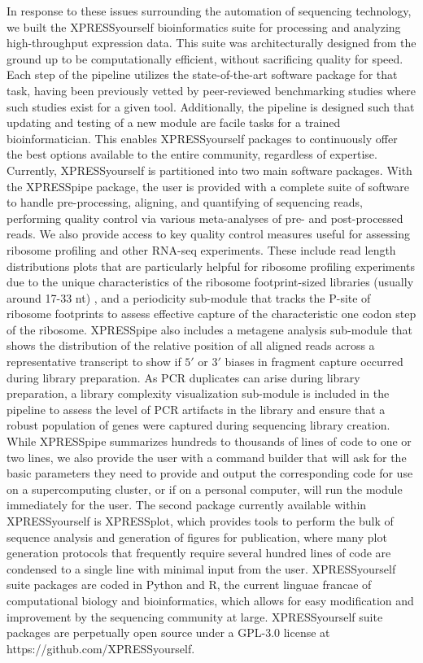 \documentclass[10pt, oneside]{article}
\begin{document}
In response to these issues surrounding the automation of sequencing technology, we built the XPRESSyourself bioinformatics suite for processing and analyzing high-throughput expression data. This suite was architecturally designed from the ground up to be computationally efficient, without sacrificing quality for speed. Each step of the pipeline utilizes the state-of-the-art software package for that task, having been previously vetted by peer-reviewed benchmarking studies where such studies exist for a given tool. Additionally, the pipeline is designed such that updating and testing of a new module are facile tasks for a trained bioinformatician. This enables XPRESSyourself packages to continuously offer the best options available to the entire community, regardless of expertise. \\

Currently, XPRESSyourself is partitioned into two main software packages. With the XPRESSpipe package, the user is provided with a complete suite of software to handle pre-processing, aligning, and quantifying of sequencing reads, performing quality control via various meta-analyses of pre- and post-processed reads. We also provide access to key quality control measures useful for assessing ribosome profiling and other RNA-seq experiments. These include read length distributions plots that are particularly helpful for ribosome profiling experiments due to the unique characteristics of the ribosome footprint-sized libraries (usually around 17-33 nt) \cite{fp_range}, and a periodicity sub-module that tracks the P-site of ribosome footprints to assess effective capture of the characteristic one codon step of the ribosome. XPRESSpipe also includes a metagene analysis sub-module that shows the distribution of the relative position of all aligned reads across a representative transcript to show if $5'$ or $3'$ biases in fragment capture occurred during library preparation. As PCR duplicates can arise during library preparation, a library complexity visualization sub-module is included in the pipeline to assess the level of PCR artifacts in the library and ensure that a robust population of genes were captured during sequencing library creation. While XPRESSpipe summarizes hundreds to thousands of lines of code to one or two lines, we also provide the user with a command builder that will ask for the basic parameters they need to provide and output the corresponding code for use on a supercomputing cluster, or if on a personal computer, will run the module immediately for the user. The second package currently available within XPRESSyourself is XPRESSplot, which provides tools to perform the bulk of sequence analysis and generation of figures for publication, where many plot generation protocols that frequently require several hundred lines of code are condensed to a single line with minimal input from the user. XPRESSyourself suite packages are coded in Python and R, the current linguae francae of computational biology and bioinformatics, which allows for easy modification and improvement by the sequencing community at large. XPRESSyourself suite packages are perpetually open source under a GPL-3.0 license at https://github.com/XPRESSyourself. \\
\end{document}
